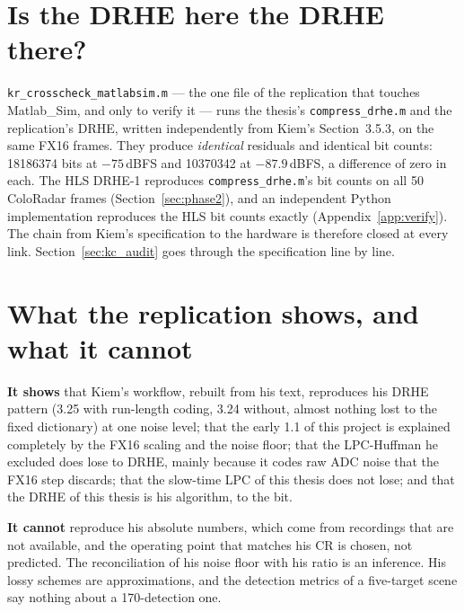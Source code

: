\section{Is the DRHE here the DRHE there?}
\label{sec:kr_crosscheck}

\texttt{kr\_crosscheck\_matlabsim.m} --- the one file of the replication that
touches Matlab\_Sim, and only to verify it --- runs the thesis's
\texttt{compress\_drhe.m} and the replication's DRHE, written independently from
Kiem's Section~3.5.3, on the same FX16 frames. They produce \emph{identical}
residuals and identical bit counts: \num{18186374} bits at $-75$\,dBFS and
\num{10370342} at $-87.9$\,dBFS, a difference of zero in each. The HLS DRHE-1
reproduces \texttt{compress\_drhe.m}'s bit counts on all 50 ColoRadar frames
(Section~\ref{sec:phase2}), and an independent Python implementation reproduces
the HLS bit counts exactly (Appendix~\ref{app:verify}). The chain from Kiem's
specification to the hardware is therefore closed at every link.
Section~\ref{sec:kc_audit} goes through the specification line by line.

\section{What the replication shows, and what it cannot}
\label{sec:kr_limits}

\begin{keybox}
\textbf{It shows} that Kiem's workflow, rebuilt from his text, reproduces his
DRHE pattern (3.25 with run-length coding, 3.24 without, almost nothing lost
to the fixed dictionary) at one noise level; that the early 1.1 of this project
is explained completely by the FX16 scaling and the noise floor; that the
LPC-Huffman he excluded does lose to DRHE, mainly because it codes raw ADC noise
that the FX16 step discards; that the slow-time LPC of this thesis does not lose;
and that the DRHE of this thesis is his algorithm, to the bit.

\textbf{It cannot} reproduce his absolute numbers, which come from recordings
that are not available, and the operating point that matches his CR is chosen,
not predicted. The reconciliation of his noise floor with his ratio is an
inference. His lossy schemes are approximations, and the detection metrics of
a five-target scene say nothing about a 170-detection one.
\end{keybox}
